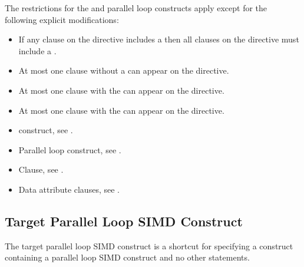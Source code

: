 \restrictions
The restrictions for the  and parallel loop constructs apply except for the following explicit modifications:

\begin{itemize}
\item If any  clause on the directive includes a
       then all  clauses 
      on the directive must include a .

\item At most one  clause without a 
       can appear on the directive.

\item At most one  clause with the  
       can appear on the directive.


\item At most one  clause with the  
       can appear on the directive.
\end{itemize}

\crossreferences
\begin{itemize}
\item {} construct, see
.

\item Parallel loop construct, see
.

\item {} Clause, see .

\item Data attribute clauses, see
.

\end{itemize}










\subsection{Target Parallel Loop SIMD Construct}
\label{subsec:Target Parallel Loop SIMD Construct}
\summary
The target parallel loop SIMD construct is a shortcut for specifying a  
construct containing a parallel loop SIMD construct and no other statements.

